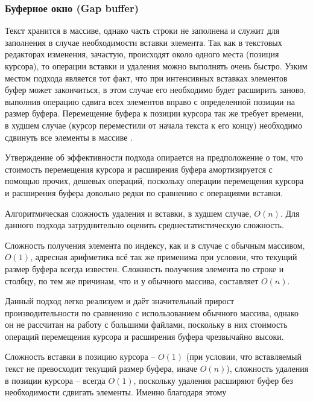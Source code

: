 \documentclass{fefu}
\begin{document}
			\subsubsection{Буферное окно (Gap buffer)}
				\par Текст хранится в массиве, однако часть строки не заполнена и служит для
				заполнения в случае необходимости вставки элемента. Так как в текстовых
				редакторах изменения, зачастую, происходят около одного места (позиция 
				курсора), то операции вставки и удаления можно выполнять очень быстро.
				Узким местом подхода является тот факт, что при интенсивных вставках элементов
				буфер может закончиться, в этом случае его необходимо будет расширить заново,
				выполнив операцию сдвига всех элементов вправо с определенной позиции на размер
				буфера. Перемещение буфера к позиции курсора так же требует времени, в худшем 
				случае (курсор переместили от начала текста к его концу) необходимо сдвинуть
				все элементы в массиве \cite{GapBufferArticle}.
				\par Утверждение об эффективности подхода опирается на предположение о том, что 
				стоимость перемещения курсора и расширения буфера амортизируется с помощью 
				прочих, дешевых операций, поскольку операции перемещения курсора и расширения 
				буфера довольно редки по сравнению с операциями вставки.
				\par Алгоритмическая сложность удаления и вставки, в худшем случае, $O(n)$. Для
				данного подхода затруднительно оценить среднестатистическую сложность.
				\par Сложность получения элемента по индексу, как и в случае с обычным 
				массивом, $O(1)$, адресная арифметика всё так же применима при условии, что
				текущий размер буфера всегда известен. Сложность получения элемента по строке и
				столбцу, по тем же причинам, что и у обычного массива, составляет $O(n)$.
				\par Данный подход легко реализуем и даёт значительный прирост
				производительности по сравнению с использованием обычного массива, однако он не
				рассчитан на работу с большими файлами, поскольку в них стоимость операций 
				перемещения курсора и расширения буфера чрезвычайно высоки.
				\par Сложность вставки в позицию курсора -- $O(1)$ (при условии, что 
				вставляемый текст не превосходит текущий размер буфера, иначе $O(n)$), 
				сложность удаления в позиции курсора -- всегда $O(1)$, поскольку удаления
				расширяют буфер без необходимости сдвигать элементы. Именно благодаря этому
\end{document}
